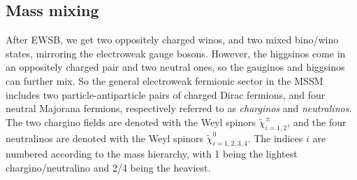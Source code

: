 \documentclass[../main.tex]{subfiles}
\begin{document}
\subsection{Mass mixing}
After EWSB, we get two oppositely charged winos, and two mixed bino/wino states, mirroring the electroweak gauge bosons.
However, the higgsinos come in an oppositely charged pair and two neutral ones, so the gauginos and higgsinos can further mix.
So the general electroweak fermionic sector in the MSSM includes two particle-antiparticle pairs of charged Dirac fermions, and four neutral Majorana fermions, respectively referred to as \emph{charginos} and \emph{neutralinos}.
The two chargino fields are denoted with the Weyl spinors \(\tilde\chi_{i=1,2}^\pm\), and the four neutralinos are denoted with the Weyl spinors \(\tilde\chi_{i=1,2,3,4}^0\).
The indices \(i\) are numbered according to the mass hierarchy, with 1 being the lightest chargino/neutralino and 2/4 being the heaviest.
\end{document}
